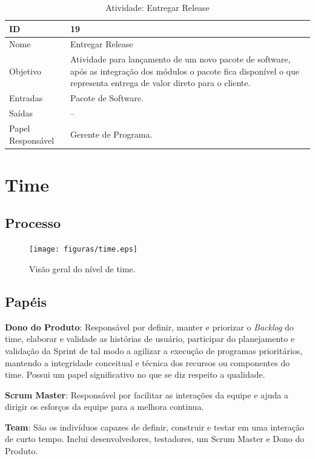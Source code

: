   \begin{table}[H]
    \centering
      \begin{tabular}{| m{5em} | m{10cm} |}
        \hline
        ID       & 19   \\ \hline
        Nome     & Entregar Release  \\ \hline
        Objetivo & Atividade para lançamento de um novo pacote de software, após as integração dos módulos o pacote fica disponível o que representa entrega de valor direto para o cliente. \\ \hline
        Entradas & Pacote de Software. \\ \hline
        Saídas   & -- \\ \hline
        Papel Responsável   & Gerente de Programa. \\ \hline
      \end{tabular}
      \caption{Atividade: Entregar Release}
      \label{tabela:atividade16}
  \end{table}

\section{Time}
  \subsection{Processo}

  \begin{figure}[H]
      \centering
    \texttt{[image: figuras/time.eps]}
      \caption{Visão geral do nível de time.}
      \label{fig:time}
  \end{figure}

  \subsection{Papéis}

\textbf{Dono do Produto}: Responsável por definir, manter e priorizar o \textit{Backlog} do time,
elaborar e validade as histórias de usuário, participar do planejamento e validação
da Sprint de tal modo a agilizar a execução de programas prioritários, mantendo a
integridade conceitual e técnica dos recursos ou componentes do time. Possui um papel
significativo no que se diz respeito a qualidade.

\textbf{Scrum Master}: Responsável por facilitar as interações da equipe e ajuda
a dirigir os esforços da equipe para a melhora continua.

\textbf{Team}: São os indivíduos capazes de definir, construir e testar em uma interação
de curto tempo. Inclui desenvolvedores, testadores, um Scrum Master e Dono do Produto.

